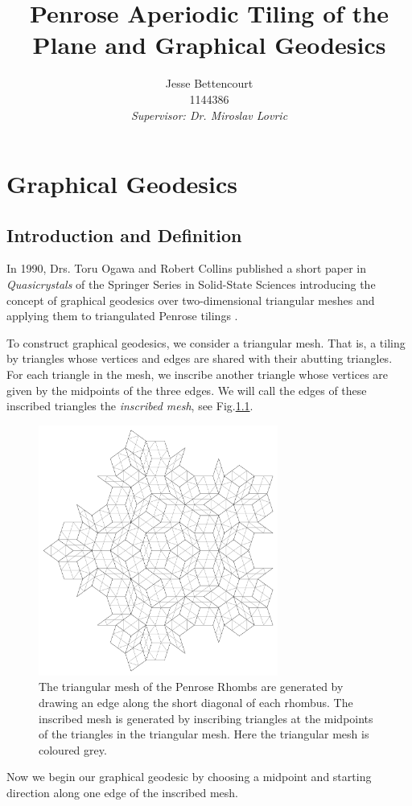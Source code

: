 \documentclass[
  oneside,
  11pt, a4paper,
  footinclude=true,
  headinclude=true,
  cleardoublepage=empty
]{scrbook}
\title{Penrose Aperiodic Tiling of the Plane and Graphical Geodesics}
\author{Jesse Bettencourt\\1144386\\[80pt]  \textit{Supervisor: Dr. Miroslav Lovric}}
\begin{document}
\chapter{Graphical Geodesics}
\section{Introduction and Definition}
In 1990, Drs. Toru Ogawa and Robert Collins published a short paper in \textit{Quasicrystals} of the Springer Series in Solid-State Sciences introducing the concept of graphical geodesics over two-dimensional triangular meshes and applying them to triangulated Penrose tilings \cite{Ogawa1999}. 

To construct graphical geodesics, we consider a triangular mesh. That is, a tiling by triangles whose vertices and edges are shared with their abutting triangles. For each triangle in the mesh, we inscribe another triangle whose vertices are given by the midpoints of the three edges. We will call the edges of these inscribed triangles the \textit{inscribed mesh}, see Fig.\ref{fig:inscribedmesh}.
\begin{figure}[H]
\centering
\includegraphics[width=0.7\textwidth]{InscribedMesh}
\caption[Inscribed Mesh]{The triangular mesh of the Penrose Rhombs are generated by drawing an edge along the short diagonal of each rhombus. The inscribed mesh is generated by inscribing triangles at the midpoints of the triangles in the triangular mesh. Here the triangular mesh is coloured grey.}
\label{fig:inscribedmesh}
\end{figure}
Now we begin our graphical geodesic by choosing a midpoint and starting direction along one edge of the inscribed mesh. 
\end{document}
